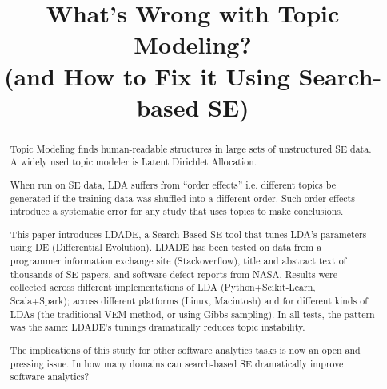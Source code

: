 \documentclass[10pt,conference]{IEEEtran}
\theoremstyle{break}
\begin{document}
\pagestyle{plain}

\title{What's Wrong with
Topic Modeling?\\ (and How to Fix it Using Search-based SE)}


\author{
\and
{}
\and
{}
}

\maketitle


\begin{abstract}
  Topic Modeling finds
  human-readable structures in large sets of unstructured SE data.
  A widely used topic modeler is Latent Dirichlet Allocation.

 When run on SE data, LDA suffers
 from ``order effects'' i.e. 
 different topics be generated if the training data was shuffled into a different order.
Such order effects introduce a systematic error for any study that uses
topics to make  conclusions.

This paper introduces LDADE, a 
Search-Based SE tool that tunes LDA's parameters using DE 
(Differential Evolution). 
LDADE has  been tested on  data from a programmer
information exchange site (Stackoverflow), title and abstract text of thousands
of SE papers, and software defect reports from NASA.  Results were collected
across different implementations of LDA (Python+Scikit-Learn, Scala+Spark); across
different platforms (Linux, Macintosh) and for different kinds of LDAs (the
traditional VEM method, or using Gibbs sampling). In all tests, the pattern was
the same: LDADE's tunings dramatically reduces topic instability.
  
The implications of this study for other software analytics tasks is now an open
and pressing issue. 
In how many domains can search-based SE dramatically improve software analytics?

\end{abstract}
\end{document}
